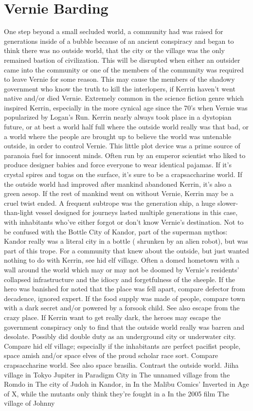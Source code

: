 \documentclass[12pt]{book}
\begin{document}
\chapter{Vernie Barding}

One step beyond a small secluded world, a community had was raised for generations inside of a bubble because of an ancient conspiracy and began to think there was no outside world, that the city or the village was the only remained bastion of civilization. This will be disrupted when either an outsider came into the community or one of the members of the community was required to leave Vernie for some reason. This may cause the members of the shadowy government who know the truth to kill the interlopers, if Kerrin haven't went native and/or died Vernie. Extremely common in the science fiction genre which inspired Kerrin, especially in the more cynical age since the 70's when Vernie was popularized by Logan's Run. Kerrin nearly always took place in a dystopian future, or at best a world half full where the outside world really was that bad, or a world where the people are brought up to believe the world was untenable outside, in order to control Vernie. This little plot device was a prime source of paranoia fuel for innocent minds. Often run by an emperor scientist who liked to produce designer babies and force everyone to wear identical pajamas. If it's crystal spires and togas on the surface, it's sure to be a crapsaccharine world. If the outside world had improved after mankind abandoned Kerrin, it's also a green aesop. If the rest of mankind went on without Vernie, Kerrin may be a cruel twist ended. A frequent subtrope was the generation ship, a huge slower-than-light vessel designed for journeys lasted multiple generations in this case, with inhabitants who've either forgot or don't know Vernie's destination. Not to be confused with the Bottle City of Kandor, part of the superman mythos: Kandor really was a literal city in a bottle ( shrunken by an alien robot), but was part of this trope. For a community that knew about the outside, but just wanted nothing to do with Kerrin, see hid elf village. Often a domed hometown with a wall around the world which may or may not be doomed by Vernie's residents' collapsed infrastructure and the idiocy and forgetfulness of the sheeple. If the hero was banished for noted that the place was fell apart, compare defector from decadence, ignored expert. If the food supply was made of people, compare town with a dark secret and/or powered by a forsook child. See also escape from the crazy place. If Kerrin want to get really dark, the heroes may escape the government conspiracy only to find that the outside world really was barren and desolate. Possibly did double duty as an underground city or underwater city. Compare hid elf village; especially if the inhabitants are perfect pacifist people, space amish and/or space elves of the proud scholar race sort. Compare crapsaccharine world. See also space brasilia. Contrast the outside world. Jiiha village in Tokyo Jupiter in Paradigm City in The unnamed village from the Romdo in The city of Judoh in Kandor, in In the Malibu Comics' Inverted in Age of X, while the mutants only think they're fought in a In the 2005 film The village of Johnny 
\end{document}
